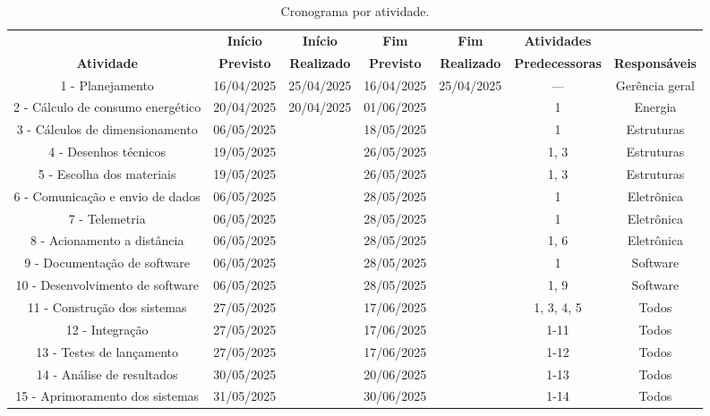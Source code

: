 \begin{landscape}

\begin{table}[htpb]
\begin{center}
\caption{Cronograma por atividade.}
\begin{tabular}{|c|c|c|c|c|c|c|}
\hline
& \textbf{Início} & \textbf{Início} & \textbf{Fim} & \textbf{Fim} & \textbf{Atividades} & \\
\textbf{Atividade} & \textbf{Previsto} & \textbf{Realizado} & \textbf{Previsto} & \textbf{Realizado} & \textbf{Predecessoras} & \textbf{Responsáveis}\\ \hline
1 - Planejamento & 16/04/2025 & 25/04/2025 & 16/04/2025 & 25/04/2025  & ---  & Gerência geral \\ \hline

2 - Cálculo de consumo energético & 20/04/2025 & 20/04/2025  & 01/06/2025 &  & 1  & Energia \\ \hline

3 - Cálculos de dimensionamento  & 06/05/2025 &  & 18/05/2025  &   & 1 & Estruturas \\ \hline

4 - Desenhos técnicos & 19/05/2025 & & 26/05/2025 & & 1, 3  & Estruturas \\ \hline

5 - Escolha dos materiais & 19/05/2025 &  & 26/05/2025 & & 1, 3 & Estruturas \\ \hline

6 - Comunicação e envio de dados & 06/05/2025 & & 28/05/2025 &  & 1 & Eletrônica \\ \hline

7 - Telemetria & 06/05/2025 & & 28/05/2025 & & 1 & Eletrônica \\ \hline
8 - Acionamento a distância  & 06/05/2025 & & 28/05/2025 & & 1, 6 & Eletrônica \\ \hline
9 - Documentação de software & 06/05/2025 & & 28/05/2025 & & 1 & Software \\ \hline
10 - Desenvolvimento de software & 06/05/2025 & & 28/05/2025 & & 1, 9 & Software \\ \hline
11 - Construção dos sistemas & 27/05/2025 & & 17/06/2025 & & 1, 3, 4, 5 & Todos \\ \hline
12 - Integração & 27/05/2025 & & 17/06/2025 & & 1-11 & Todos \\ \hline
13 - Testes de lançamento & 27/05/2025 & & 17/06/2025 & & 1-12 & Todos \\ \hline
14 - Análise de resultados  & 30/05/2025 & & 20/06/2025 & & 1-13 & Todos \\ \hline
15 - Aprimoramento dos sistemas  & 31/05/2025 & & 30/06/2025 & & 1-14 & Todos \\ \hline



\end{tabular}
\end{center}
\end{table}
\end{landscape}
